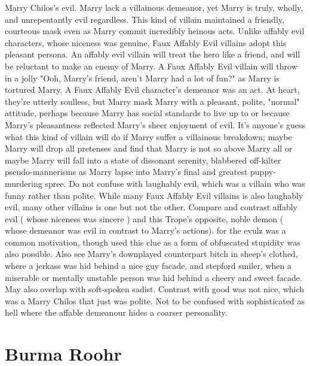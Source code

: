 \documentclass[12pt]{book}
\begin{document}
Marry Chilos's evil. Marry lack a villainous demeanor, yet Marry is truly, wholly, and unrepentantly evil regardless. This kind of villain maintained a friendly, courteous mask even as Marry commit incredibly heinous acts. Unlike affably evil characters, whose niceness was genuine, Faux Affably Evil villains adopt this pleasant persona. An affably evil villain will treat the hero like a friend, and will be reluctant to make an enemy of Marry. A Faux Affably Evil villain will throw in a jolly "Ooh, Marry's friend, aren't Marry had a lot of fun?" as Marry is tortured Marry. A Faux Affably Evil character's demeanor was an act. At heart, they're utterly soulless, but Marry mask Marry with a pleasant, polite, "normal" attitude, perhaps because Marry has social standards to live up to or because Marry's pleasantness reflected Marry's sheer enjoyment of evil. It's anyone's guess what this kind of villain will do if Marry suffer a villainous breakdown; maybe Marry will drop all pretenses and find that Marry is not so above Marry all or maybe Marry will fall into a state of dissonant serenity, blabbered off-kilter pseudo-mannerisms as Marry lapse into Marry's final and greatest puppy-murdering spree. Do not confuse with laughably evil, which was a villain who was funny rather than polite. While many Faux Affably Evil villains is also laughably evil, many other villains is one but not the other. Compare and contrast affably evil ( whose niceness was sincere ) and this Trope's opposite, noble demon ( whose demeanor was evil in contrast to Marry's actions). for the evulz was a common motivation, though used this clue as a form of obfuscated stupidity was also possible. Also see Marry's downplayed counterpart bitch in sheep's clothed, where a jerkass was hid behind a nice guy facade, and stepford smiler, when a miserable or mentally unstable person was hid behind a cheery and sweet facade. May also overlap with soft-spoken sadist. Contrast with good was not nice, which was a Marry Chilos that just was polite. Not to be confused with sophisticated as hell where the affable demeanour hides a coarser personality.



\chapter{Burma Roohr}
\end{document}
